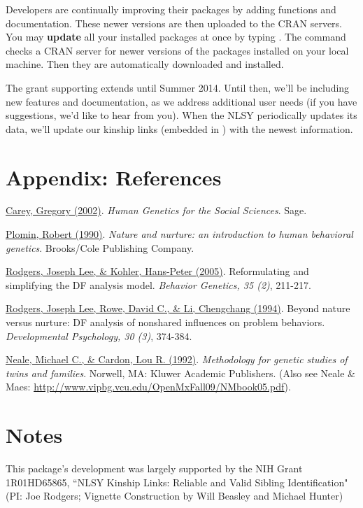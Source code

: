 \documentclass[letterpaper]{article}\usepackage{graphicx, color}
\begin{document}
Developers are continually improving their packages by adding functions and
documentation.  These newer versions are then uploaded to the CRAN servers.  You
may \textbf{update} all your installed packages at once by typing
.  The command checks a CRAN server for
newer versions of the packages installed on your local machine.  Then they are
automatically downloaded and installed. 

The grant supporting  extends until Summer 2014.  Until then,
we'll be including new features and documentation, as we address additional user
needs (if you have suggestions, we'd like to hear from you).  When the NLSY periodically updates its data, we'll
update our kinship links (embedded in ) with the newest information.
\section{Appendix: References} \label{sec:References}
\href{http://psych.colorado.edu/~carey/hgss/}{Carey, Gregory (2002)}. \emph{Human Genetics for the Social Sciences}. Sage.

\href{http://books.google.com/books?id=r7AgAQAAIAAJ&source=gbs_navlinks_s}{Plomin, Robert (1990)}. \emph{Nature and nurture: an introduction to human behavioral genetics}.  Brooks/Cole Publishing Company.

\href{http://www.springerlink.com/content/n3x1v1q282583366}{Rodgers, Joseph Lee, \& Kohler, Hans-Peter (2005)}. Reformulating and simplifying the DF analysis model. \emph{Behavior Genetics, 35 (2)}, 211-217.

\href{http://psycnet.apa.org/journals/dev/30/3/374/}{Rodgers, Joseph Lee, Rowe, David C., \& Li, Chengchang (1994)}. Beyond nature versus nurture: DF analysis of nonshared influences on problem behaviors. \emph{Developmental Psychology, 30 (3)}, 374-384. 

\href{http://books.google.com/books/about/Methodology_for_genetic_studies_of_twins.html?id=vVzDmDv6WDkC}{Neale, Michael C., \& Cardon, Lou R. (1992)}. \emph{Methodology for genetic studies of twins and families}. Norwell, MA: Kluwer Academic Publishers. (Also see Neale \& Maes: \url{http://www.vipbg.vcu.edu/OpenMxFall09/NMbook05.pdf}).
 
\section{Notes}
This package's development was largely supported by the NIH Grant 1R01HD65865, ``NLSY Kinship Links: Reliable and Valid Sibling Identification" (PI: Joe Rodgers; Vignette Construction by Will Beasley and Michael Hunter)
\end{document}
